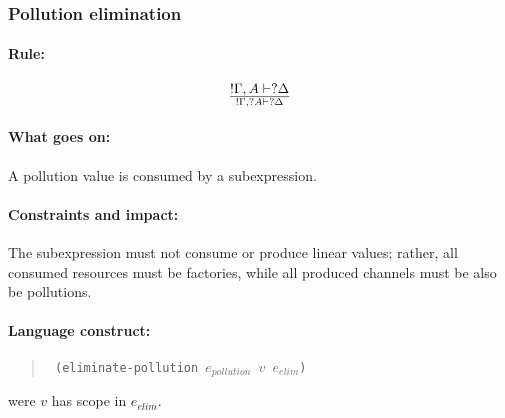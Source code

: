 \documentclass[a4paper]{article}
\begin{document}
\subsubsection{Pollution elimination}
\paragraph{Rule:}
$$
{
  !\Gamma, A \vdash ?\Delta
}\over{
  !\Gamma, ?A \vdash ?\Delta
}
$$
\paragraph{What goes on:} A pollution value is consumed by a subexpression.

\paragraph{Constraints and impact:} The subexpression must not consume
or produce linear values; rather, all consumed resources must be
factories, while all produced channels must be also be pollutions.

\paragraph{Language construct:}
\begin{quote}\tt
  (eliminate-pollution $e_{pollution}$ $v$ $e_{elim}$)
\end{quote}
were $v$ has scope in $e_{elim}$.





\end{document}

